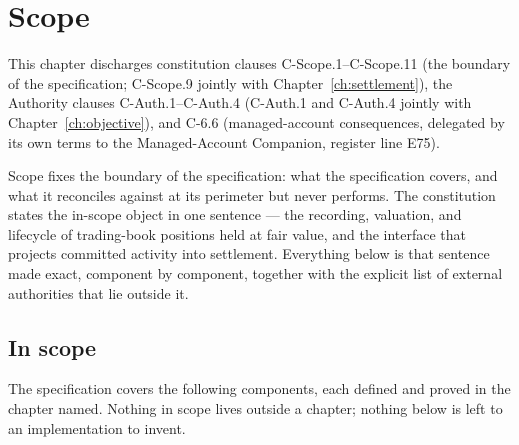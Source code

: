 \section{Scope}\label{ch:scope}

This chapter discharges constitution clauses C-Scope.1--C-Scope.11 (the boundary of the specification; C-Scope.9 jointly with Chapter~\ref{ch:settlement}), the Authority clauses C-Auth.1--C-Auth.4 (C-Auth.1 and C-Auth.4 jointly with Chapter~\ref{ch:objective}), and C-6.6 (managed-account consequences, delegated by its own terms to the Managed-Account Companion, register line E75).

Scope fixes the boundary of the specification: what the specification covers, and what it
reconciles against at its perimeter but never performs. The constitution states the
in-scope object in one sentence --- the recording, valuation, and lifecycle of
trading-book positions held at fair value, and the interface that projects committed
activity into settlement. Everything below is that sentence made exact, component by
component, together with the explicit list of external authorities that lie outside it.

\subsection{In scope}

The specification covers the following components, each defined and proved in the chapter
named. Nothing in scope lives outside a chapter; nothing below is left to an implementation
to invent.

